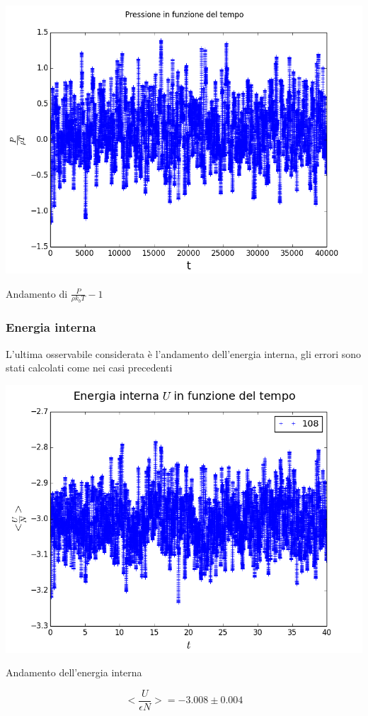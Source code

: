 \begin{myfig}
\includegraphics[scale=0.55]{soft_core/10_pres.png}
\caption{Andamento di $\frac{P}{\rho k_b T} - 1$}
\end{myfig}

\subsubsection{Energia interna}
L'ultima osservabile considerata è l'andamento dell'energia interna, gli errori sono stati calcolati come nei casi precedenti

\begin{myfig}
\includegraphics[scale=0.55]{soft_core/10_U.png}
\caption{Andamento dell'energia interna}
\end{myfig}
$$
<\frac{U}{\epsilon N}> = -3.008 \pm 0.004
$$

